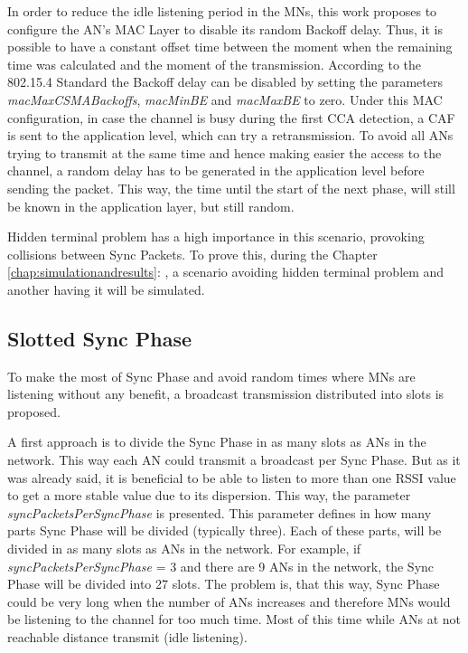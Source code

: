 In order to reduce the idle listening period in the \acp{MN}, this work proposes to configure the \ac{AN}'s \ac{MAC} Layer to disable its random 
Backoff delay. Thus, it is possible to have a constant offset time between the moment when the remaining time was calculated and the moment of the 
transmission. According to the 802.15.4 Standard the Backoff delay can be disabled by setting the parameters \textit{macMaxCSMABackoffs}, 
\textit{macMinBE} and \textit{macMaxBE} to zero. Under this \ac{MAC} configuration, in case the channel is busy during the first \ac{CCA} detection, a \ac{CAF} 
is sent to the application level, which can try a retransmission. To avoid all \acp{AN} trying to transmit at the same time and hence making easier 
the access to the channel, a random delay has to be generated in the application level before sending the packet. This way, the time until the start of the
next phase, will still be known in the application layer, but still random.

Hidden terminal problem has a high importance in this scenario, provoking collisions between Sync Packets. To prove this, during the Chapter 
\ref{chap:simulationandresults}: , a scenario avoiding hidden terminal problem and another having it will be simulated.

\subsection{Slotted Sync Phase}
\label{subsec:slottedsyncphase}

To make the most of Sync Phase and avoid random times where \acp{MN} are listening without any benefit, a broadcast transmission distributed into slots is proposed.

A first approach is to divide the Sync Phase in as many slots as \acp{AN} in the network. This way each \ac{AN} could transmit a broadcast per Sync Phase.
But as it was already said, it is beneficial to be able to listen to more than one \ac{RSSI} value to get a more stable value due to its dispersion. This
way, the parameter \textit{syncPacketsPerSyncPhase} is presented. This parameter defines in how many parts Sync Phase will be divided (typically three). Each of 
these parts, will be divided in as many slots as \acp{AN} in the network. For example, if \textit{syncPacketsPerSyncPhase} = 3 and there are 9 \acp{AN} in the 
network, the Sync Phase will be divided into 27 slots. The problem is, that this way, Sync Phase could be very long when the number of \acp{AN} increases and therefore
\acp{MN} would be listening to the channel for too much time. Most of this time while \acp{AN} at not reachable distance transmit (idle listening).

